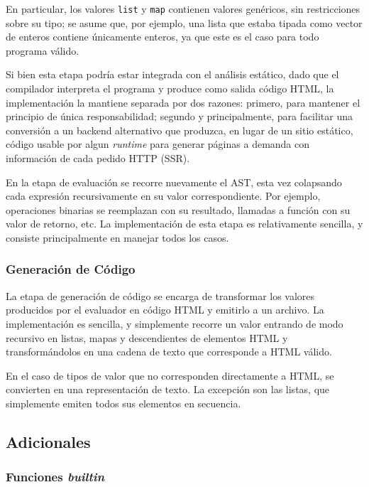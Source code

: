 En particular, los valores \texttt{list} y \texttt{map} contienen valores genéricos, sin restricciones sobre su tipo; se asume que, por ejemplo, una lista que estaba tipada como vector de enteros contiene únicamente enteros, ya que este es el caso para todo programa válido.

Si bien esta etapa podría estar integrada con el análisis estático, dado que el compilador interpreta el programa y produce como salida código HTML, la implementación la mantiene separada por dos razones: primero, para mantener el principio de única responsabilidad; segundo y principalmente, para facilitar una conversión a un backend alternativo que produzca, en lugar de un sitio estático, código usable por algun \textit{runtime} para generar páginas a demanda con información de cada pedido HTTP (SSR).

En la etapa de evaluación se recorre nuevamente el AST, esta vez colapsando cada expresión recursivamente en su valor correspondiente. Por ejemplo, operaciones binarias se reemplazan con su resultado, llamadas a función con su valor de retorno, etc. La implementación de esta etapa es relativamente sencilla, y consiste principalmente en manejar todos los casos.

\subsubsection{Generación de Código}

La etapa de generación de código se encarga de transformar los valores producidos por el evaluador en código HTML y emitirlo a un archivo. La implementación es sencilla, y simplemente recorre un valor entrando de modo recursivo en listas, mapas y descendientes de elementos HTML y transformándolos en una cadena de texto que corresponde a HTML válido.

En el caso de tipos de valor que no corresponden directamente a HTML, se convierten en una representación de texto. La excepción son las listas, que simplemente emiten todos sus elementos en secuencia.

\subsection{Adicionales}

\subsubsection{Funciones \textit{builtin}}

